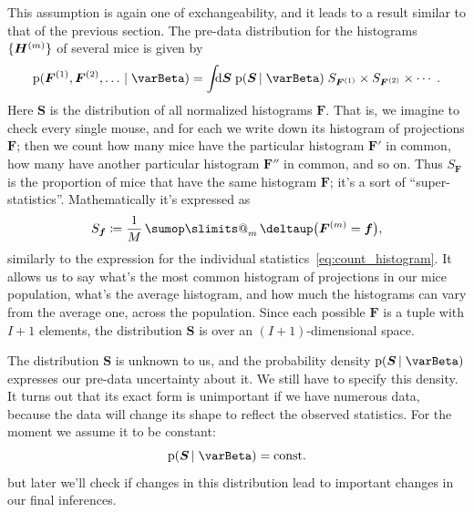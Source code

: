 \documentclass[\ifafour a4paper,12pt,\else a5paper,10pt,\fi%
onecolumn,oneside,article,%
british%
]{memoir}
\makeatletter
\theoremstyle{remark}
\theoremstyle{innote}
\def\sum{\DOTSI\sumop\slimits@}
\newcommand*{\delt}{\deltaup}%
\newcommand*{\di}{\mathrm{d}}%
\newcommand*{\defd}{\coloneqq}
\newcommand*{\pf}{\mathrm{p}}%
\renewcommand*{\|}[1][]{\nonscript\,#1\vert\nonscript\;\mathopen{}}
\newcommand*{\tsum}{\mathop{\textstyle\sum}\nolimits}
\newcommand*{\yI}{\varBeta}
\newcommand*{\yF}{\bm{F}}
\newcommand*{\yFm}[1][m]{\yF^{(#1)}}
\newcommand*{\yH}{\bm{H}}
\newcommand*{\yHm}[1][m]{\yH^{(#1)}}
\newcommand*{\ySS}{S}
\newcommand*{\yS}{\bm{\ySS}}
\DeclarePairedDelimiter\tu{\{}{\}}
\makeatother
\begin{document}
This assumption is again one of exchangeability, and it leads to a result
similar to that of the previous section. The pre-data distribution for the
histograms $\tu{\yHm}$ of several mice is given by
\begin{equation}
  \label{eq:distr_H_mice}
  \pf( \yFm[1], \yFm[2], \dotsc \| \yI) =
  \int\!\!\!\di \yS\;
  \pf(\yS \| \yI)\;
  \ySS_{\yFm[1]} \times \ySS_{\yFm[2]} \times \dotsm\;.
\end{equation}
Here $\yS$ is the distribution of all normalized histograms $\yF$. That is,
we imagine to check every single mouse, and for each we write down 
its histogram of projections $\yF$; then we count how many mice have the
particular histogram $\yF'$ in common, how many have another particular
histogram $\yF''$ in common, and so on. Thus $\ySS_{\yF}$ is the proportion
of mice that have the same histogram $\yF$; it's a sort of
\enquote{super-statistics}. Mathematically it's expressed as
  \begin{equation}
    \label{eq:count_superhistogram}
    \ySS_{\bm{f}} \defd \frac{1}{M} \tsum_{m} \delt\bigl(\yFm = \bm{f}\bigr),
\end{equation}
similarly to the expression for the individual
statistics~\eqref{eq:count_histogram}. It allows us to say what's the most
common histogram of projections in our mice population, what's the average
histogram, and how much the histograms can vary from the average one,
across the population. Since each possible $\yF$ is a tuple with $I+1$
elements, the distribution $\yS$ is over an $(I+1)$-dimensional space.

The distribution $\yS$ is unknown to us, and the probability density
$\pf(\yS \| \yI)$ expresses our pre-data uncertainty about it. We still
have to specify this density. It turns out that its exact form is
unimportant if we have numerous data, because the data will change its
shape to reflect the observed statistics.
For the moment we assume it to be constant:
\begin{equation}
  \label{eq:distr_lambda}
  \pf(\yS \| \yI) = \text{const.}
\end{equation}
but later we'll check if changes in this distribution lead to important
changes in our final inferences.
\end{document}
